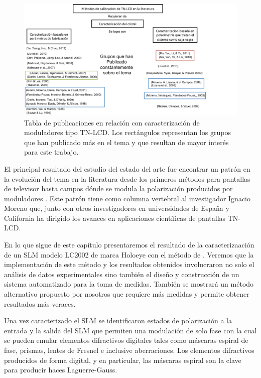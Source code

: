 \begin{figure}[h!]
\centering
\includegraphics[scale=.6]{articulos_metodos}
\caption[Publicaciones en relación a la caracterización de TN-LCD]{Tabla de publicaciones en relación con caracterización de
  moduladores tipo TN-LCD. Los rectángulos representan los grupos que
  han publicado más en el tema y que resultan de mayor interés para
  este trabajo. }
\label{fig:articulos_metodos}
\end{figure}
El principal resultado del estudio del estado del arte fue encontrar
un patrón en la evolución del tema en la literatura desde los primeros
métodos para pantallas de televisor  hasta campos
dónde se modula la polarización producidos por moduladores
. Este patrón tiene como columna vertebral al 
investigador Ignacio Moreno que, junto con otros investigadores en
universidades de España y California ha dirigido los avances en aplicaciones
científicas de pantallas TN-LCD. 

En lo que sigue de este capítulo presentaremos el resultado de la
caracterizaación de un SLM modelo LC2002 de marca Holoeye con el
método de .
Veremos que la implementación de este método y los resultados
obtenidos involucraron no solo el análisis de datos experimentales sino también el diseño y
construcción de un sistema automatizado para la toma de medidas.  
También se mostrará un método alternativo propuesto por nosotros que requiere más medidas
y permite obtener resultados más veraces. 

Una vez caracterizado el SLM se identificaron estados de polarización
a la entrada y la salida del SLM que permiten una modulación de solo
fase con la cual se pueden emular elementos difractivos digitales
tales como máscaras espiral de fase, prismas, lentes de Fresnel e
inclusive aberraciones. Los elementos difractivos producidos de forma 
digital, y en particular, las máscaras espiral 
 son la clave para producir haces Laguerre-Gauss.  


